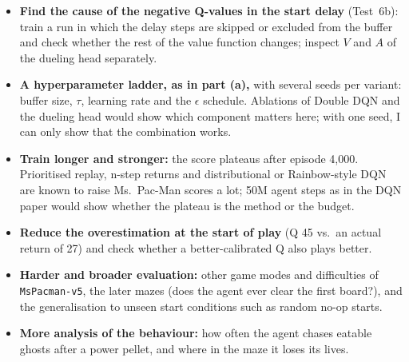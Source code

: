 \begin{itemize}
  \item \textbf{Find the cause of the negative Q-values in the start delay} (Test~6b): train a run in which the delay steps are skipped or excluded from the buffer and check whether the rest of the value function changes; inspect $V$ and $A$ of the dueling head separately.
  \item \textbf{A hyperparameter ladder, as in part (a),} with several seeds per variant: buffer size, $\tau$, learning rate and the $\epsilon$ schedule. Ablations of Double DQN and the dueling head would show which component matters here; with one seed, I can only show that the combination works.
  \item \textbf{Train longer and stronger:} the score plateaus after episode 4,000. Prioritised replay, n-step returns and distributional or Rainbow-style DQN are known to raise Ms.\ Pac-Man scores a lot; 50M agent steps as in the DQN paper would show whether the plateau is the method or the budget.
  \item \textbf{Reduce the overestimation at the start of play} (Q 45 vs.\ an actual return of 27) and check whether a better-calibrated Q also plays better.
  \item \textbf{Harder and broader evaluation:} other game modes and difficulties of \texttt{MsPacman-v5}, the later mazes (does the agent ever clear the first board?), and the generalisation to unseen start conditions such as random no-op starts.
  \item \textbf{More analysis of the behaviour:} how often the agent chases eatable ghosts after a power pellet, and where in the maze it loses its lives.
\end{itemize}
